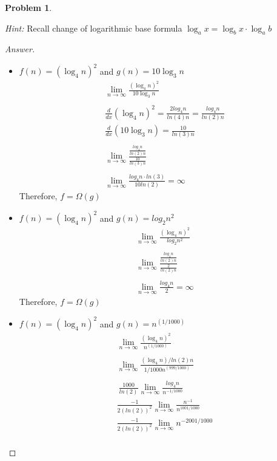 \documentclass[11pt]{article}
\theoremstyle{definition}
\theoremstyle{definition}
\newtheorem{required}{Problem}
\theoremstyle{definition}
\begin{document}
\begin{required}
\begin{enumerate} [label=(\alph*)]
    \emph{Hint:} Recall change of logarithmic base formula $\log_a x = \log_b x\cdot\log_a b$
    \begin{proof}[Answer] $ $ \\
    \begin{itemize}
        \item  $f(n) = (\log_4 n)^2$ and $g(n) =10 \log_3 n $
        \begin{align*}
        \lim_{n \to \infty} \frac{(\log_4 n)^2}{10 \log_3 n} \\ \\
        \frac{d}{dx}(\log_4 n)^2 = \frac{2log_4n}{ln(4)n} = \frac{log_4n}{ln(2)n} \\
        \frac{d}{dx}(10 \log_3 n) = \frac{10}{ln(3)n} \\ \\
        \lim_{n \to \infty} \frac{\frac{log_4n}{ln(2)n}}{\frac{10}{ln(3)n}} \\ \\
        \lim_{n \to \infty} \frac{log_4n \cdot ln(3)}{10ln(2)} = \infty
        \end{align*}
        Therefore, $f=\Omega(g)$
        \item $f(n) = (\log_4 n)^2$ and $g(n) = log_2n^2 $
        \begin{align*}
        \lim_{n \to \infty} \frac{(\log_4 n)^2}{log_2n^2} \\ \\
        \lim_{n \to \infty} \frac{\frac{log_4n}{ln(2)n}}{\frac{2}{ln(2)n}} \\ \\
         \lim_{n \to \infty}\frac{log_4n}{2} = \infty
        \end{align*}
        Therefore, $f=\Omega(g)$
        \item $f(n) = (\log_4 n)^2$ and $g(n) = n ^ {(1/1000)}$
        \begin{align*}
             \lim_{n \to \infty} \frac{(\log_4 n)^2}{n ^ {(1/1000)}}  \\ \\
             \lim_{n \to \infty} \frac{(\log_4 n)/ln(2)n}{1/1000 n ^ {(999/1000)}} \\ \\\
             \frac{1000}{ln(2)}\lim_{n \to \infty} \frac{log_4n}{n^{-1/1000}} \\
             \frac{-1}{2(ln(2))^2}\lim_{n \to \infty} \frac{n^{-1}}{n^{1001/1000}} \\
             \frac{-1}{2(ln(2))^2} \lim_{n \to \infty} n^{-2001/1000}  \\

\end{align*}
\end{itemize}
\end{proof}
\end{enumerate}
\end{required}
\end{document}

